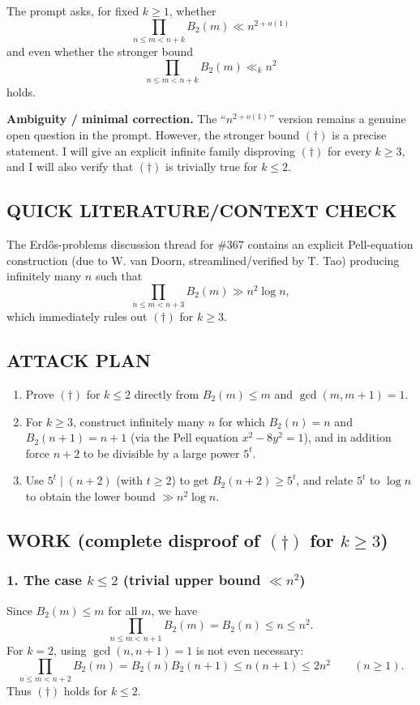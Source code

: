 The prompt asks, for fixed $k\ge 1$, whether
\[
\prod_{n\le m<n+k} B_2(m) \ll n^{2+o(1)}
\]
and even whether the stronger bound
\[
\prod_{n\le m<n+k} B_2(m) \ll_k n^{2}
\tag{$\dagger$}
\]
holds.

\textbf{Ambiguity / minimal correction.} The ``$n^{2+o(1)}$'' version remains a genuine open question in the prompt. However, the stronger bound $(\dagger)$ is a precise statement. I will give an explicit infinite family disproving $(\dagger)$ for every $k\ge 3$, and I will also verify that $(\dagger)$ is trivially true for $k\le 2$.

\subsection*{QUICK LITERATURE/CONTEXT CHECK}
The Erd\H{o}s-problems discussion thread for \#367 contains an explicit Pell-equation construction (due to W. van Doorn, streamlined/verified by T. Tao) producing infinitely many $n$ such that
\[
\prod_{n\le m<n+3} B_2(m) \gg n^2 \log n,
\]
which immediately rules out $(\dagger)$ for $k\ge 3$.

\subsection*{ATTACK PLAN}
\begin{enumerate}
\item Prove $(\dagger)$ for $k\le 2$ directly from $B_2(m)\le m$ and $\gcd(m,m+1)=1$.
\item For $k\ge 3$, construct infinitely many $n$ for which $B_2(n)=n$ and $B_2(n+1)=n+1$ (via the Pell equation $x^2-8y^2=1$), and in addition force $n+2$ to be divisible by a large power $5^t$.
\item Use $5^t\mid (n+2)$ (with $t\ge 2$) to get $B_2(n+2)\ge 5^t$, and relate $5^t$ to $\log n$ to obtain the lower bound $\gg n^2\log n$.
\end{enumerate}

\subsection*{WORK (complete disproof of $(\dagger)$ for $k\ge 3$)}
\subsubsection*{1. The case $k\le 2$ (trivial upper bound $\ll n^2$)}
Since $B_2(m)\le m$ for all $m$, we have
\[
\prod_{n\le m<n+1} B_2(m) = B_2(n)\le n\le n^2.
\]
For $k=2$, using $\gcd(n,n+1)=1$ is not even necessary:
\[
\prod_{n\le m<n+2} B_2(m) = B_2(n)B_2(n+1)\le n(n+1) \le 2n^2\qquad (n\ge 1).
\]
Thus $(\dagger)$ holds for $k\le 2$.

